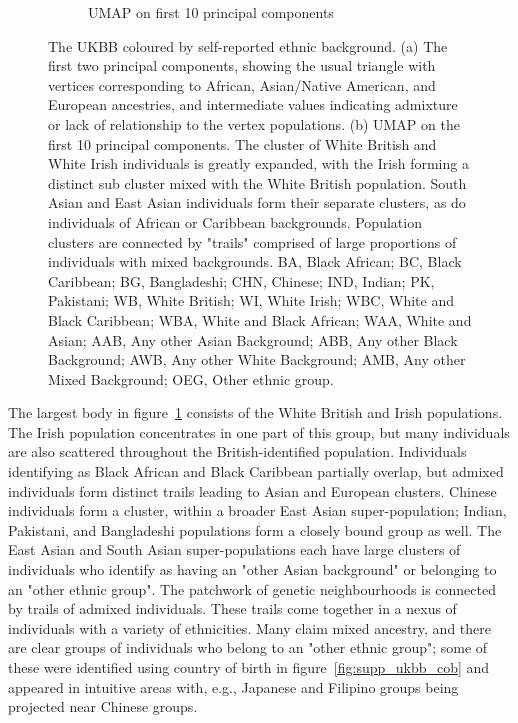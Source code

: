 \documentclass[12pt]{pnas-new}
\begin{document}
\begin{figure}
\begin{subfigure}{.5\columnwidth}
\caption{UMAP on first 10 principal components}%
\label{fig:umap_ukbb_pc10}%
\end{subfigure}%
\caption{The UKBB coloured by self-reported ethnic background. (a) The first two principal components, showing the usual triangle with vertices corresponding to African, Asian/Native American, and European ancestries, and intermediate values indicating admixture or lack of relationship to the vertex populations. (b) UMAP on the first 10 principal components. The cluster of White British and White Irish individuals is greatly expanded, with the Irish forming a distinct sub cluster mixed with the White British population. South Asian and East Asian individuals form their separate clusters, as do individuals of African or Caribbean backgrounds. Population clusters are connected by "trails" comprised of large proportions of individuals with mixed backgrounds.
BA, Black African; 
BC, Black Caribbean; 
BG, Bangladeshi; 
CHN, Chinese; 
IND, Indian;
PK, Pakistani;
WB, White British;
WI, White Irish;
WBC, White and Black Caribbean; 
WBA, White and Black African; 
WAA, White and Asian;
AAB, Any other Asian Background; 
ABB, Any other Black Background;
AWB, Any other White Background;
AMB, Any other Mixed Background;
OEG, Other ethnic group. 
}
\label{fig:fig_ukbb}
\end{figure}

The largest body in figure~\ref{fig:umap_ukbb_pc10} consists of the White British and Irish populations. The Irish population concentrates in one part of this group, but many individuals are also scattered throughout the British-identified population. Individuals identifying as Black African and Black Caribbean partially overlap, but admixed individuals form distinct trails leading to Asian and European clusters. Chinese individuals form a cluster, within a broader East Asian super-population; Indian, Pakistani, and Bangladeshi populations form a closely bound group as well. The East Asian and South Asian super-populations each have large clusters of individuals who identify as having an "other Asian background" or belonging to an "other ethnic group". The patchwork of genetic neighbourhoods is connected by trails of admixed individuals. These trails come together in a nexus of individuals with a variety of ethnicities. Many claim mixed ancestry, and there are clear groups of individuals who belong to an "other ethnic group"; some of these were identified using country of birth in figure~\ref{fig:supp_ukbb_cob} and appeared in intuitive areas with, e.g., Japanese and Filipino groups being projected near Chinese groups.
\end{document}
